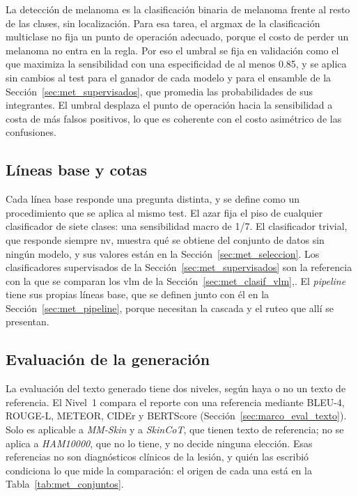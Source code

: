 La detección de melanoma es la clasificación binaria de melanoma frente al resto de las clases, sin localización.
Para esa tarea, el argmax de la clasificación multiclase no fija un punto de operación adecuado, porque el costo de
perder un melanoma no entra en la regla. Por eso el umbral se fija en validación como el que maximiza la
sensibilidad con una especificidad de al menos 0.85, y se aplica sin cambios al test para el ganador de cada modelo
y para el ensamble de la Sección~\ref{sec:met_supervisados}, que promedia las probabilidades de sus integrantes. El
umbral desplaza el punto de operación hacia la sensibilidad a costa de más falsos positivos, lo que es coherente con
el costo asimétrico de las confusiones.

\subsection{Líneas base y cotas}
\label{sec:met_lineas_base}

Cada línea base responde una pregunta distinta, y se define como un procedimiento que se aplica al mismo test. El
azar fija el piso de cualquier clasificador de siete clases: una sensibilidad macro de 1/7. El clasificador trivial,
que responde siempre \gls{nv}, muestra qué se obtiene del conjunto de datos sin ningún modelo, y sus valores están
en la Sección~\ref{sec:met_seleccion}. Los clasificadores supervisados de la Sección~\ref{sec:met_supervisados} son
la referencia con la que se comparan los \gls{vlm} de la Sección~\ref{sec:met_clasif_vlm},. El \emph{pipeline} tiene sus propias líneas
base, que se definen junto con él en la Sección~\ref{sec:met_pipeline}, porque necesitan la cascada y el ruteo que
allí se presentan.

\subsection{Evaluación de la generación}
\label{sec:met_eval_generacion}

La evaluación del texto generado tiene dos niveles, según haya o no un texto de referencia. El Nivel~1 compara el
reporte con una referencia mediante BLEU-4, ROUGE-L, METEOR, CIDEr y BERTScore (Sección~\ref{sec:marco_eval_texto}).
Solo es aplicable a \emph{MM-Skin} y a \emph{SkinCoT}, que tienen texto de referencia; no se aplica a
\emph{HAM10000}, que no lo tiene, y no decide ninguna elección. Esas referencias no son diagnósticos clínicos de la
lesión, y quién las escribió condiciona lo que mide la comparación: el origen de cada una está en la
Tabla~\ref{tab:met_conjuntos}.

